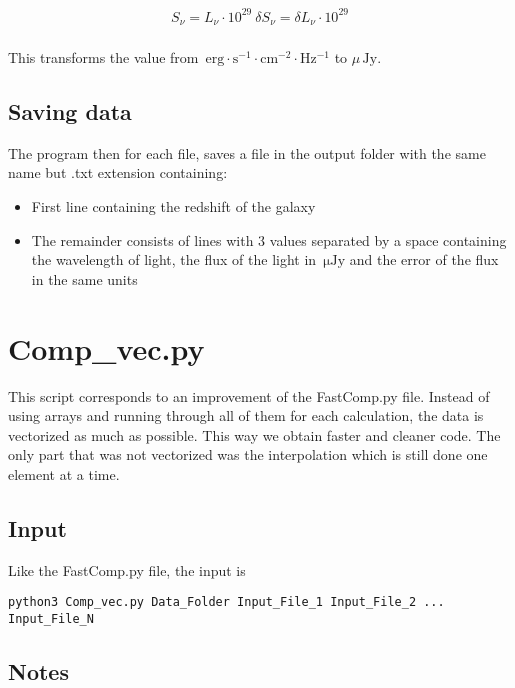 \documentclass[11pt]{article}
\newcommand{\unit}[1]{\ensuremath{\, \mathrm{#1}}}
\begin{document}
\begin{align*}
S_\nu = L_\nu \cdot 10^{29}\
\delta S_\nu = \delta L_\nu \cdot 10^{29}\\
\end{align*}

This transforms the value from $\unit{erg\cdot s^{-1}\cdot cm^{-2} \cdot Hz^{-1}}$ to $\mu \unit{Jy}$.

\subsection{Saving data}

The program then for each file, saves a file in the output folder with the same name but .txt extension containing:
\begin{itemize}
\item First line containing the redshift of the galaxy
\item The remainder consists of lines with 3 values separated by a space containing the wavelength of light, the flux of the light in $\unit{\mu Jy}$ and the error of the flux in the same units
\end{itemize}

\newpage

\section{Comp\_vec.py}

This script corresponds to an improvement of the FastComp.py file. Instead of using arrays and running through all of them for each calculation, the data is vectorized as much as possible. This way we obtain faster and cleaner code. The only part that was not vectorized was the interpolation which is still done one element at a time.

\subsection{Input}
Like the FastComp.py file, the input is 
\begin{verbatim}
python3 Comp_vec.py Data_Folder Input_File_1 Input_File_2 ... Input_File_N
\end{verbatim}

\subsection{Notes}
\end{document}
